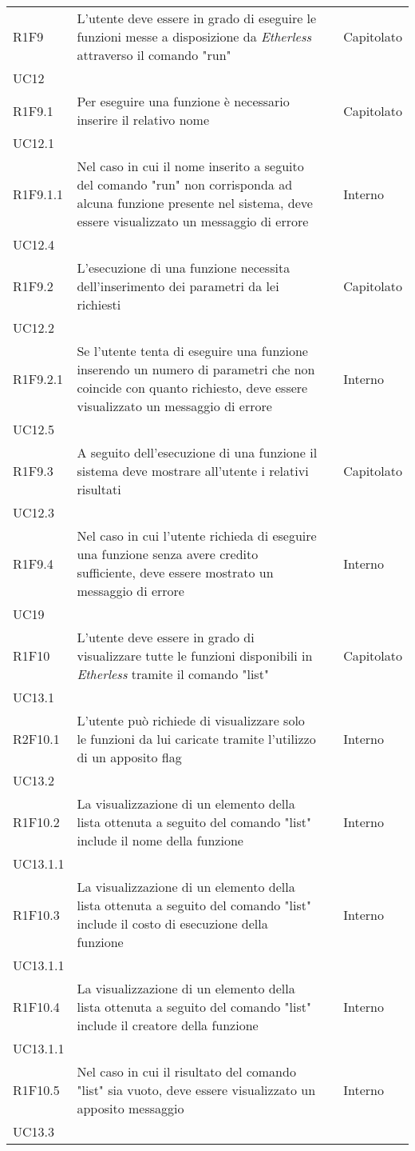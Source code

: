 \begin{longtable}{ 
		>{\centering}p{} 
		>{}p{} 
		>{\centering}p{}
		>{\centering}p{} }
	R1F9 & L'utente deve essere in grado di eseguire le funzioni messe a 
		disposizione da \textit{Etherless} attraverso il comando "run" 				& \ob & Capitolato \\ UC12 \tabularnewline
	R1F9.1 & Per eseguire una funzione è necessario inserire il relativo nome 		& \ob & Capitolato \\ UC12.1 \tabularnewline
	R1F9.1.1 & Nel caso in cui il nome inserito a seguito del comando "run" non 
		corrisponda ad alcuna funzione presente nel sistema, deve essere 
		visualizzato un messaggio di errore											& \ob & Interno \\ UC12.4 \tabularnewline 
	R1F9.2 & L'esecuzione di una funzione necessita dell'inserimento dei parametri 
		da lei richiesti 															& \ob & Capitolato \\ UC12.2 \tabularnewline
	R1F9.2.1 & Se l'utente tenta di eseguire una funzione inserendo un numero 
		di parametri che non coincide con quanto richiesto, deve essere 
		visualizzato un messaggio di errore 										& \ob & Interno \\ UC12.5 \tabularnewline
	R1F9.3 & A seguito dell'esecuzione di una funzione il sistema deve mostrare 
		all'utente i relativi risultati 											& \ob & Capitolato \\ UC12.3 \tabularnewline
	R1F9.4 & Nel caso in cui l'utente richieda di eseguire una funzione senza 
		avere credito sufficiente, deve essere mostrato un messaggio di errore		& \ob & Interno \\ UC19 \tabularnewline
	
	R1F10 & L'utente deve essere in grado di visualizzare tutte le funzioni 
		disponibili in \textit{Etherless} tramite il comando "list" 				& \ob & Capitolato \\ UC13.1 \tabularnewline
	R2F10.1 & L'utente può richiede di visualizzare solo le funzioni da 
		lui caricate tramite l'utilizzo di un apposito flag 						& \de & Interno \\ UC13.2 \tabularnewline
	R1F10.2 & La visualizzazione di un elemento della lista ottenuta a seguito 
		del comando "list" include il nome della funzione 							& \ob & Interno \\ UC13.1.1 \tabularnewline
	R1F10.3 & La visualizzazione di un elemento della lista ottenuta a seguito 
		del comando "list" include il costo di esecuzione della funzione 			& \ob & Interno \\ UC13.1.1 \tabularnewline
	R1F10.4 & La visualizzazione di un elemento della lista ottenuta a seguito 
		del comando "list" include il creatore della funzione 						& \ob & Interno \\ UC13.1.1 \tabularnewline
	R1F10.5 & Nel caso in cui il risultato del comando "list" sia vuoto, deve 
		essere visualizzato un apposito messaggio 									& \ob & Interno \\ UC13.3 \tabularnewline
	

\end{longtable}
